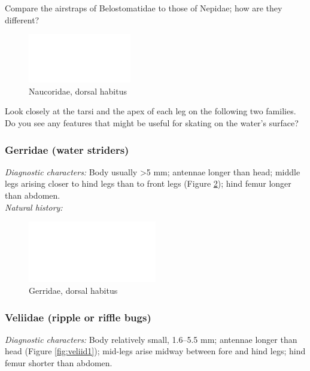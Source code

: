 \documentclass[letterpaper, 11pt]{article}
\begin{document}
\noindent{}Compare the airstraps of Belostomatidae to those of Nepidae; how are they different?\vspace{2cm}

\begin{figure}[ht!]
 \centering
 \includegraphics[width=0.4\textwidth]{image14}
 \caption{Naucoridae, dorsal habitus}
 \label{fig:naucor1}
\end{figure}

\noindent{}Look closely at the tarsi and the apex of each leg on the following two families. Do you see any features that might be useful for skating on the water's surface?

\subsubsection{Gerridae (water striders)}
\noindent{}\textit{Diagnostic characters:} Body usually \textgreater5 mm; antennae longer than head; middle legs arising closer to hind legs than to front legs (Figure \ref{fig:gerrid1}); hind femur longer than abdomen.\\

\noindent{}\textit{Natural history:} \\

\begin{figure}[ht!]
 \centering
 \includegraphics[width=0.5\textwidth]{image14}
 \caption{Gerridae, dorsal habitus}
 \label{fig:gerrid1}
\end{figure}

\subsubsection{Veliidae (ripple or riffle bugs)}
\noindent{}\textit{Diagnostic characters:} Body relatively small, 1.6--5.5 mm; antennae longer than head (Figure \ref{fig:veliid1}); mid-legs arise midway between fore and hind legs; hind femur shorter than abdomen.\\
\end{document}
